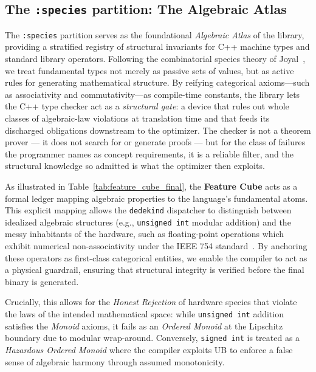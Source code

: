 \documentclass[11pt, a4paper]{report}
\begin{document}
\subsection{The \texttt{:species} partition: The Algebraic Atlas}

The \texttt{:species} partition serves as the foundational \textit{Algebraic Atlas} of the library, providing a stratified registry of structural invariants for C++ machine types and standard library operators. Following the combinatorial species theory of Joyal~\cite{joyal1981species, joyal1986analytic}, we treat fundamental types not merely as passive sets of values, but as active rules for generating mathematical structure. By reifying categorical axioms---such as associativity and commutativity---as compile-time constants, the library lets the C++ type checker act as a \emph{structural gate}: a device that rules out whole classes of algebraic-law violations at translation time and that feeds its discharged obligations downstream to the optimizer. The checker is not a theorem prover --- it does not search for or generate proofs --- but for the class of failures the programmer names as concept requirements, it is a reliable filter, and the structural knowledge so admitted is what the optimizer then exploits.

As illustrated in Table~\ref{tab:feature_cube_final}, the \textbf{Feature Cube} acts as a formal ledger mapping algebraic properties to the language's fundamental atoms. This explicit mapping allows the \texttt{dedekind} dispatcher to distinguish between idealized algebraic structures (e.g., \texttt{unsigned int} modular addition) and the messy inhabitants of the hardware, such as floating-point operations which exhibit numerical non-associativity under the IEEE 754 standard~\cite{ieee754_2019}.
By anchoring these operators as first-class categorical entities, we enable the compiler to act as a physical guardrail, ensuring that structural integrity is verified before the final binary is generated. 

Crucially, this allows for the \textit{Honest Rejection} of hardware species that violate the laws of the intended mathematical space: while \texttt{unsigned int} addition satisfies the \textit{Monoid} axioms, it fails as an \textit{Ordered Monoid} at the Lipschitz boundary due to modular wrap-around. Conversely, \texttt{signed int} is treated as a \textit{Hazardous Ordered Monoid} where the compiler exploits UB to enforce a false sense of algebraic harmony through assumed monotonicity.
\end{document}
